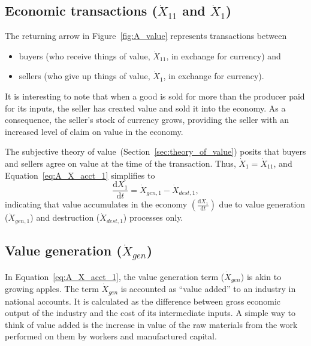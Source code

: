 \subsection[Economic transactions]{Economic transactions ($\dot{X}_{11}$ and $\dot{X}_{1}$)}

The returning arrow in Figure~\ref{fig:A_value} 
represents transactions between 
%
\begin{itemize}

	\item{buyers (who receive things of value, $\dot{X}_{11}$,
	in exchange for currency) and}

	\item{sellers (who give up things of value, $\dot{X}_{1}$,
	in exchange for currency).}

\end{itemize}
%
It is interesting to note that when a good is sold for more
than the producer paid for its inputs, 
the seller has created value and sold it into the economy. 
As a consequence, the seller's stock of currency grows,
providing the seller with an increased level of claim 
on value in the economy.

The subjective theory of value~(Section~\ref{sec:theory_of_value})
posits that buyers and sellers agree on value at the 
time of the transaction.
Thus, $\dot{X}_{1} = \dot{X}_{11}$, and Equation~\ref{eq:A_X_acct_1}
simplifies to
%
\begin{equation} \label{eq:A_X_acct_2}	
	\frac{\mathrm{d}X_{1}}{\mathrm{d}t}	
	= \dot{X}_{gen,1}
	- \dot{X}_{dest,1},
\end{equation}
%
indicating that value accumulates in the economy
$\left( \frac{\mathrm{d}X_{1}}{\mathrm{d}t} \right)$
due to value generation ($\dot{X}_{gen,1}$) 
and destruction ($\dot{X}_{dest,1}$) processes only.


\subsection[Value generation]{Value generation ($\dot{X}_{gen}$)}
\label{sec:value_generation}

\noindent In Equation~\ref{eq:A_X_acct_1}, 
the value generation term ($\dot{X}_{gen}$) is akin to growing apples.
The term $\dot{X}_{gen}$ is accounted as ``value added'' to an industry in national accounts.
It is calculated as the difference between gross economic output of the industry
and the cost of its intermediate inputs.\cite{BEAVA}  
A simple way to think of value added is
the increase in value of the raw materials from the work performed 
on them by workers and manufactured capital.


